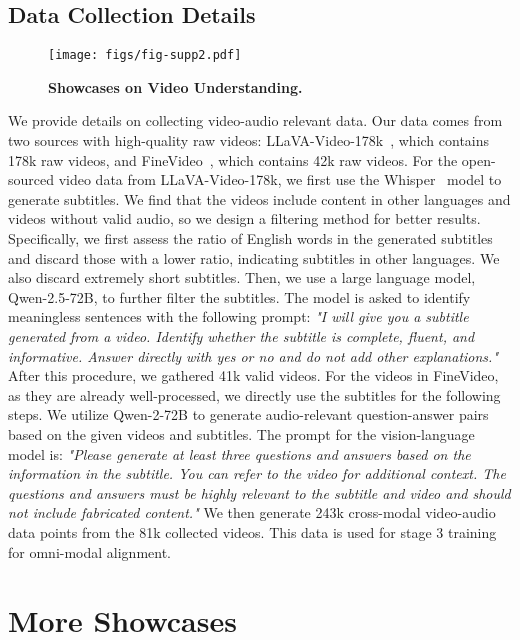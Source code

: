 \subsection{Data Collection Details}


\begin{figure*}[t]
\centering
\texttt{[image: figs/fig-supp2.pdf]}
\caption{\textbf{Showcases on Video Understanding.}}
\label{fig:supp2}
\end{figure*}

We provide details on collecting video-audio relevant data. Our data comes from two sources with high-quality raw videos: LLaVA-Video-178k~\citep{zhang2024llavanextvideo}, which contains 178k raw videos, and FineVideo~\citep{Farré2024FineVideo}, which contains 42k raw videos. For the open-sourced video data from LLaVA-Video-178k, we first use the Whisper~\citep{radford2022whisper} model to generate subtitles. We find that the videos include content in other languages and videos without valid audio, so we design a filtering method for better results. Specifically, we first assess the ratio of English words in the generated subtitles and discard those with a lower ratio, indicating subtitles in other languages. We also discard extremely short subtitles. Then, we use a large language model, Qwen-2.5-72B, to further filter the subtitles. The model is asked to identify meaningless sentences with the following prompt: \textit{"I will give you a subtitle generated from a video. Identify whether the subtitle is complete, fluent, and informative. Answer directly with yes or no and do not add other explanations."} After this procedure, we gathered 41k valid videos. For the videos in FineVideo, as they are already well-processed, we directly use the subtitles for the following steps. We utilize Qwen-2-72B to generate audio-relevant question-answer pairs based on the given videos and subtitles. The prompt for the vision-language model is: \textit{"Please generate at least three questions and answers based on the information in the subtitle. You can refer to the video for additional context. The questions and answers must be highly relevant to the subtitle and video and should not include fabricated content."} We then generate 243k cross-modal video-audio data points from the 81k collected videos. This data is used for stage 3 training for omni-modal alignment.

\section{More Showcases}


